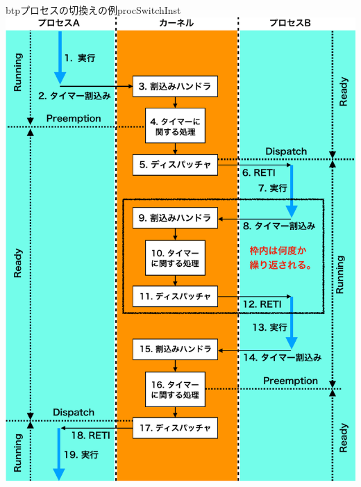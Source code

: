 \begin{myfig}{btp}{プロセスの切換えの例}{procSwitchInst}
  \includegraphics[scale=0.6]{Fig/procSwitchInst-crop.pdf}
\end{myfig}

